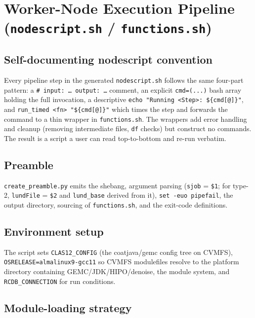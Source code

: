 \section{Worker-Node Execution Pipeline (\texttt{nodescript.\allowbreak{}sh} /
\texttt{functions.\allowbreak{}sh})}\label{ch:9}

\subsection{Self-documenting nodescript convention}

Every pipeline step in the generated \texttt{nodescript.\allowbreak{}sh} follows the same four-part pattern: a
\texttt{\# input:\allowbreak{} \ldots{} output:\allowbreak{} \ldots{}} comment, an explicit
\texttt{cmd=\allowbreak{}(.\allowbreak{}.\allowbreak{}.\allowbreak{})} bash array holding the full invocation,
a descriptive \texttt{echo "Running <Step>:\allowbreak{} \$\{cmd[@]\}"}, and \texttt{run\_\allowbreak{}timed
<fn> "\$\{cmd[@]\}"} which times the step and forwards the command to a thin wrapper in
\texttt{functions.\allowbreak{}sh}. The wrappers add error handling and cleanup (removing intermediate files,
\texttt{df} checks) but construct no commands. The result is a script a user can read top-to-bottom and re-run
verbatim.

\subsection{Preamble}

\texttt{create\_\allowbreak{}preamble.\allowbreak{}py} emits the shebang, argument parsing (\texttt{sjob} =
\texttt{\$1}; for type-2, \texttt{lundFile} = \texttt{\$2} and \texttt{lund\_\allowbreak{}base} derived from
it), \texttt{set -\allowbreak{}euo pipefail}, the output directory, sourcing of
\texttt{functions.\allowbreak{}sh}, and the exit-code definitions.

\subsection{Environment setup}

The script sets \texttt{CLAS12\_\allowbreak{}CONFIG} (the coatjava/gemc config tree on CVMFS),
\texttt{OSRELEASE=\allowbreak{}almalinux9-\allowbreak{}gcc11} so CVMFS modulefiles resolve to the platform
directory containing GEMC/JDK/HIPO/denoise, the module system, and \texttt{RCDB\_\allowbreak{}CONNECTION} for
run conditions.

\subsection{Module-loading strategy}


